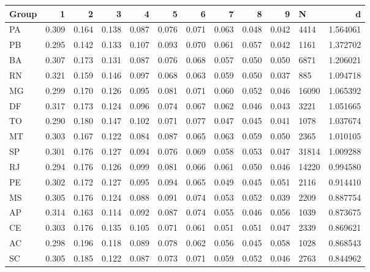 \begin{tabular}{lrrrrrrrrrlr}
\toprule
Group &      1 &      2 &      3 &      4 &      5 &      6 &      7 &      8 &      9 &      N &         d \\
\midrule
   PA &  0.309 &  0.164 &  0.138 &  0.087 &  0.076 &  0.071 &  0.063 &  0.048 &  0.042 &   4414 &  1.564061 \\
   PB &  0.295 &  0.142 &  0.133 &  0.107 &  0.093 &  0.070 &  0.061 &  0.057 &  0.042 &   1161 &  1.372702 \\
   BA &  0.307 &  0.173 &  0.131 &  0.087 &  0.076 &  0.068 &  0.057 &  0.050 &  0.050 &   6871 &  1.206021 \\
   RN &  0.321 &  0.159 &  0.146 &  0.097 &  0.068 &  0.063 &  0.059 &  0.050 &  0.037 &    885 &  1.094718 \\
   MG &  0.299 &  0.170 &  0.126 &  0.095 &  0.081 &  0.071 &  0.060 &  0.052 &  0.046 &  16090 &  1.065392 \\
   DF &  0.317 &  0.173 &  0.124 &  0.096 &  0.074 &  0.067 &  0.062 &  0.046 &  0.043 &   3221 &  1.051665 \\
   TO &  0.290 &  0.180 &  0.147 &  0.102 &  0.071 &  0.077 &  0.047 &  0.045 &  0.041 &   1078 &  1.037674 \\
   MT &  0.303 &  0.167 &  0.122 &  0.084 &  0.087 &  0.065 &  0.063 &  0.059 &  0.050 &   2365 &  1.010105 \\
   SP &  0.301 &  0.176 &  0.127 &  0.094 &  0.076 &  0.069 &  0.058 &  0.053 &  0.047 &  31814 &  1.009288 \\
   RJ &  0.294 &  0.176 &  0.126 &  0.099 &  0.081 &  0.066 &  0.061 &  0.050 &  0.046 &  14220 &  0.994580 \\
   PE &  0.302 &  0.172 &  0.127 &  0.095 &  0.094 &  0.065 &  0.049 &  0.045 &  0.051 &   2116 &  0.914410 \\
   MS &  0.305 &  0.176 &  0.124 &  0.088 &  0.091 &  0.074 &  0.053 &  0.052 &  0.039 &   2209 &  0.887754 \\
   AP &  0.314 &  0.163 &  0.114 &  0.092 &  0.087 &  0.074 &  0.055 &  0.046 &  0.056 &   1039 &  0.873675 \\
   CE &  0.303 &  0.176 &  0.135 &  0.105 &  0.071 &  0.061 &  0.051 &  0.051 &  0.047 &   2339 &  0.869621 \\
   AC &  0.298 &  0.196 &  0.118 &  0.089 &  0.078 &  0.062 &  0.056 &  0.045 &  0.058 &   1028 &  0.868543 \\
   SC &  0.305 &  0.185 &  0.122 &  0.087 &  0.073 &  0.071 &  0.059 &  0.052 &  0.046 &   2763 &  0.844962 \\

\end{tabular}
